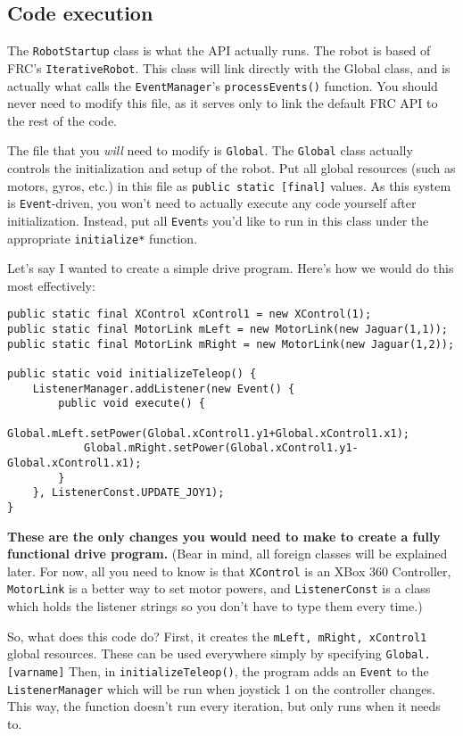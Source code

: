 \documentclass[a4paper]{article}
\begin{document}
\subsection{Code execution}The \lstinline{RobotStartup} class is what the API actually runs. The robot is based of FRC's \lstinline{IterativeRobot}. This class will link directly with the Global class, and is actually what calls the \lstinline{EventManager}'s \lstinline{processEvents()} function. You should never need to modify this file, as it serves only to link the default FRC API to the rest of the code.

The file that you \textit{will} need to modify is \lstinline{Global}. The \lstinline{Global} class actually controls the initialization and setup of the robot. Put all global resources (such as motors, gyros, etc.) in this file as \lstinline{public static [final]} values. As this system is \lstinline{Event}-driven, you won't need to actually execute any code yourself after initialization. Instead, put all \lstinline{Event}s you'd like to run in this class under the appropriate \lstinline{initialize*} function.

Let's say I wanted to create a simple drive program. Here's how we would do this most effectively:

\begin{lstlisting}
public static final XControl xControl1 = new XControl(1);
public static final MotorLink mLeft = new MotorLink(new Jaguar(1,1));
public static final MotorLink mRight = new MotorLink(new Jaguar(1,2));

public static void initializeTeleop() {
    ListenerManager.addListener(new Event() {
        public void execute() {
            Global.mLeft.setPower(Global.xControl1.y1+Global.xControl1.x1);
            Global.mRight.setPower(Global.xControl1.y1-Global.xControl1.x1);
        }
    }, ListenerConst.UPDATE_JOY1);
}\end{lstlisting}

\textbf{These are the only changes you would need to make to create a fully functional drive program.} (Bear in mind, all foreign classes will be explained later. For now, all you need to know is that \lstinline{XControl} is an XBox 360 Controller, \lstinline{MotorLink} is a better way to set motor powers, and \lstinline{ListenerConst} is a class which holds the listener strings so you don't have to type them every time.)

So, what does this code do? First, it creates the \lstinline{mLeft, mRight, xControl1} global resources. These can be used everywhere simply by specifying \lstinline{Global.[varname]} Then, in \lstinline{initializeTeleop()}, the program adds an \lstinline{Event} to the \lstinline{ListenerManager} which will be run when joystick 1 on the controller changes. This way, the function doesn't run every iteration, but only runs when it needs to.
\end{document}
